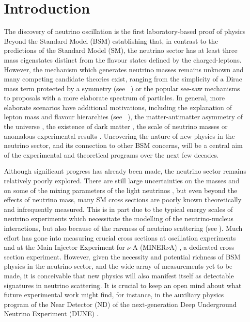 \graphicspath{{}{Zprime_scattering/}{Diagrams/}}

\section{Introduction}

The discovery of neutrino oscillation is the first laboratory-based proof of physics Beyond the Standard Model (BSM) establishing that, in contrast to the predictions of the Standard Model (SM), the neutrino sector has at least three mass eigenstates distinct from the flavour states defined by the charged-leptons. However, the mechanism which generates neutrino masses remains unknown and many competing candidate theories exist, ranging from the simplicity of a Dirac mass term protected by a symmetry (see \eg\ \cite{Chulia:2016ngi,Ma:2014qra,Aranda:2013gga}) or the popular see-saw mechanisms \cite{Minkowski:1977sc,Mohapatra:1979ia,GellMann:1980vs,Yanagida:1979as,Lazarides:1980nt,Mohapatra:1980yp,Schechter:1980gr,Cheng:1980qt,Foot:1988aq} to proposals with a more elaborate spectrum of particles. In general, more elaborate scenarios have additional motivations, including the explanation of lepton mass and flavour hierarchies (see \eg\ \cite{King:2013eh}), the matter-antimatter asymmetry of the universe \cite{Fukugita:1986hr, Asaka:2005pn, Asaka:2005an}, the existence of dark matter \cite{Boehm:2006mi,Ma:2006km}, the scale of neutrino masses \cite{Gabriel:2006ns,Davidson:2009ha,Bertuzzo:2017sbj} or anomalous experimental results \cite{Nath:2016mts}. Uncovering the nature of new physics in the neutrino sector, and its connection to other BSM concerns, will be a central aim of the experimental and theoretical programs over the next few decades.

Although significant progress has already been made, the neutrino sector remains relatively poorly explored. There are still large uncertainties on the masses and on some of the mixing parameters of the light neutrinos \cite{Esteban:2018azc}, but even beyond the effects of neutrino mass, many SM cross sections are poorly known theoretically and infrequently measured. This is in part due to the typical energy scales of neutrino experiments which necessitate the mo\-del\-ling of the neutrino-nucleus interactions, but also because of the rareness of neutrino scattering (see ). Much effort has gone into measuring crucial cross sections at oscillation experiments \cite{Abe:2015biq,Adamson:2009ju,Aguilar-Arevalo:2013dva} and at the Main Injector Experiment for $\nu$-A (MINER$\nu$A) \cite{Ren:2017xov}, a dedicated cross section experiment. However, given the necessity and potential richness of BSM physics in the neutrino sector, and the wide array of measurements yet to be made, it is conceivable that new physics will also manifest itself as detectable signatures in neutrino scattering. It is crucial to keep an open mind about what future experimental work might find, for instance, in the auxiliary physics program of the Near Detector (ND) of the next-generation Deep Underground Neutrino Experiment (DUNE) \cite{Acciarri:2016crz}.

